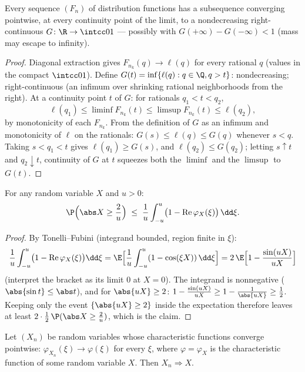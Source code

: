 \begin{theorem}
\label{thm:b3:clt:helly}
Every sequence $(F_n)$ of distribution functions has a
subsequence converging pointwise, at every continuity point
of the limit, to a nondecreasing right-continuous $G \colon
\R \to \intcc01$ --- possibly with $G(+\infty) - G(-\infty) <
1$ (mass may escape to infinity).
\end{theorem}

\begin{proof}
Diagonal extraction gives $F_{n_k}(q) \to \ell(q)$ for every
rational $q$ (values in the compact $\intcc01$). Define
$G(t) = \inf\{\ell(q) : q \in \Q, q > t\}$: nondecreasing;
right-continuous (an infimum over shrinking rational
neighborhoods from the right). At a continuity point $t$ of
$G$: for rationals $q_1 < t < q_2$,
\[
\ell(q_1) \leq \liminf F_{n_k}(t) \leq \limsup F_{n_k}(t)
\leq \ell(q_2),
\]
by monotonicity of each $F_{n_k}$. From the definition of
$G$ as an infimum and monotonicity of $\ell$ on the
rationals: $G(s) \leq \ell(q) \leq G(q)$ whenever $s < q$.
Taking $s < q_1 < t$ gives $\ell(q_1) \geq G(s)$, and
$\ell(q_2) \leq G(q_2)$; letting $s \uparrow t$ and $q_2
\downarrow t$, continuity of $G$ at $t$ squeezes both the
$\liminf$ and the $\limsup$ to $G(t)$.
\end{proof}

\begin{lemma}
\label{lem:b3:clt:tightness}
For any random variable $X$ and $u > 0$:
\[
\P\Bigl(\abs X \geq \frac2u\Bigr) \;\leq\;
\frac1u\int_{-u}^{u}\bigl(1 -
\operatorname{Re}\varphi_X(\xi)\bigr)\,\dd\xi .
\]
\end{lemma}

\begin{proof}
By Tonelli--Fubini (integrand bounded, region finite in
$\xi$):
\[
\frac1u\int_{-u}^u\bigl(1 -
\operatorname{Re}\varphi_X(\xi)\bigr)\dd\xi
= \E\Bigl[\frac1u\int_{-u}^u(1 - \cos(\xi X))\,\dd\xi\Bigr]
= 2\,\E\Bigl[1 - \frac{\sin(uX)}{uX}\Bigr]
\]
(interpret the bracket as its limit $0$ at $X = 0$). The
integrand is nonnegative ($\abs{\sin t} \leq \abs t$), and
for $\abs{uX} \geq 2$: $1 - \frac{\sin(uX)}{uX} \geq 1 -
\frac1{\abs{uX}} \geq \frac12$. Keeping only the event
$\{\abs{uX} \geq 2\}$ inside the expectation therefore
leaves at least $2 \cdot \frac12\,\P(\abs X \geq \frac2u)$,
which is the claim.
\end{proof}

\begin{theorem}
\label{thm:b3:clt:levy}
Let $(X_n)$ be random variables whose characteristic
functions converge pointwise: $\varphi_{X_n}(\xi) \to
\varphi(\xi)$ for every $\xi$, where $\varphi =
\varphi_X$ is the characteristic function of some random
variable $X$. Then $X_n \Rightarrow X$.
\end{theorem}

